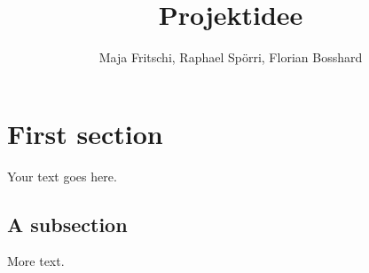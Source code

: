 \documentclass[11pt]{article}
\title{Projektidee}
\author{Maja Fritschi, Raphael Spörri, Florian Bosshard}
\date{}
\begin{document}
\maketitle

\section{First section}

Your text goes here.

\subsection{A subsection}

More text.
\end{document}
